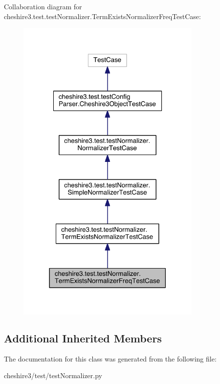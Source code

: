 Collaboration diagram for cheshire3.\-test.\-test\-Normalizer.\-Term\-Exists\-Normalizer\-Freq\-Test\-Case\-:
\nopagebreak
\begin{figure}[H]
\begin{center}
\leavevmode
\includegraphics[width=258pt]{classcheshire3_1_1test_1_1test_normalizer_1_1_term_exists_normalizer_freq_test_case__coll__graph}
\end{center}
\end{figure}
\subsection*{Additional Inherited Members}


The documentation for this class was generated from the following file\-:\begin{DoxyCompactItemize}
\item 
cheshire3/test/test\-Normalizer.\-py\end{DoxyCompactItemize}
